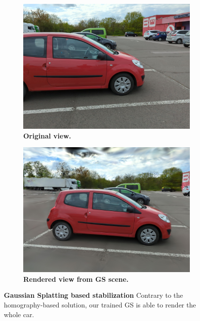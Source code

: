 \begin{figure}[htb!]
  \centering
  \begin{subfigure}[b]{0.45\linewidth}
    \includegraphics[width=\linewidth]{images/gaussiansplatting/gt/img-3.jpg}
    \caption{\textbf{Original view.}}
    \label{fig:view3}
  \end{subfigure}
  \quad %
  \begin{subfigure}[b]{0.45\linewidth}
    \includegraphics[width=\linewidth]{images/gaussiansplatting/stabgs/img-3.jpg}
    \caption{\textbf{Rendered view from GS scene.}}
    \label{fig:gs-view3-gs}
  \end{subfigure}
  \caption{\textbf{Gaussian Splatting based stabilization} Contrary to the homography-based solution, our trained GS is able to render the whole car.}
  \label{fig:gs-view3}
\end{figure}

